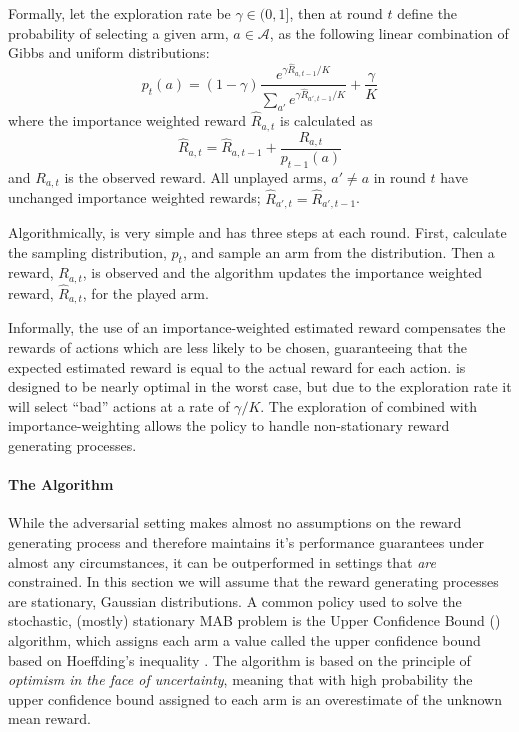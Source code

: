 Formally, let the exploration rate be $\gamma \in (0,1]$, then at round $t$ define the probability of selecting a given arm, $a\in\mathcal{A}$, as the following linear combination of Gibbs and uniform distributions:
\begin{equation}
\label{eq:exp3_sampling}
    p_{t}(a) = (1-\gamma)\dfrac{e^{\gamma\hat{R}_{a,t-1}/K}}{\sum_{a\prime}e^{\gamma \hat{R}_{a\prime,t-1}/K}}+\frac{\gamma}{K}
\end{equation}
where the importance weighted reward $\hat{R}_{a,t}$ is calculated as 
\begin{equation}
\label{eq:importance_weighted_reward}
    \hat{R}_{a,t} = \hat{R}_{a,t-1} + \frac{R_{a,t}}{p_{t-1}(a)}
\end{equation}
and $R_{a,t}$ is the observed reward. All unplayed arms, $a\prime\neq a$ in round $t$ have unchanged importance weighted rewards; $\hat{R}_{a\prime,t}=\hat{R}_{a\prime,t-1}$.

Algorithmically, \ex{} is very simple and has three steps at each round. First, calculate the sampling distribution, $p_{t}$, and sample an arm from the distribution. Then a reward, $R_{a,t}$, is observed and the algorithm updates the importance weighted reward, $\hat{R}_{a,t}$, for the played arm.

Informally, the use of an importance-weighted estimated reward compensates the rewards of actions which are less likely to be chosen, guaranteeing that the expected estimated reward is equal to the actual reward for each action. \ex{} is designed to be nearly optimal in the worst case, but due to the exploration rate it will select ``bad'' actions at a rate of $\gamma / K$. The exploration of \ex{} combined with importance-weighting allows the policy to handle non-stationary reward generating processes.

\paragraph{The \ucb{} Algorithm}
While the adversarial setting makes almost no assumptions on the reward generating process and therefore maintains it's performance guarantees under almost any circumstances, it can be outperformed in settings that \textit{are} constrained. In this section we will assume that the reward generating processes are stationary, Gaussian distributions.
A common policy used to solve the stochastic, (mostly) stationary MAB problem is the Upper Confidence Bound (\ucb{}) algorithm, which assigns each arm a value called the upper confidence bound based on Hoeffding's inequality \citep{auer2002finite}. The \ucb{} algorithm is based on the principle of \textit{optimism in the face of uncertainty}, meaning that with high probability the upper confidence bound assigned to each arm is an overestimate of the unknown mean reward.

